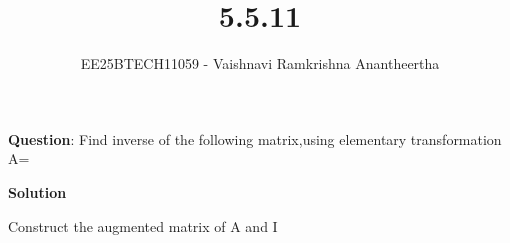 \documentclass[journal]{IEEEtran}
\title{5.5.11}
\author{EE25BTECH11059 - Vaishnavi Ramkrishna Anantheertha}
\begin{document}
\maketitle

\renewcommand{\thefigure}{\theenumi}
\renewcommand{\thetable}{\theenumi}


\textbf{Question}:
Find inverse of the following matrix,using elementary transformation\\
A=


\textbf{Solution }


Construct the augmented matrix of A and I
\end{document}
